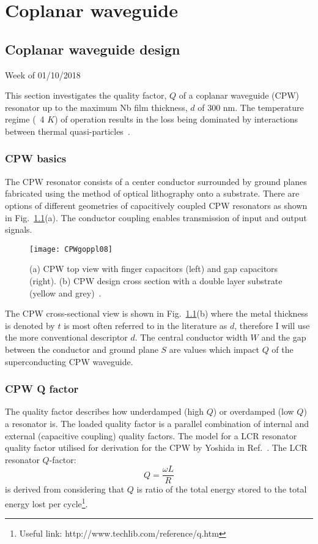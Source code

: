 \chapter{Coplanar waveguide}
\section{\label{sec:Coplanar Waveguide Design}Coplanar waveguide design}
Week of 01/10/2018

\noindent This section investigates the quality factor, $Q$ of a coplanar waveguide (CPW) resonator up to the maximum Nb film thickness, $d$ of 300 nm. The temperature regime (~4 $K$) of operation results in the loss being dominated by interactions between thermal quasi-particles~\citep{doi:10.1063/1.4962172}.      

\subsection{CPW basics}

\noindent The CPW resonator consists of a center conductor surrounded by ground planes fabricated using the method of optical lithography onto a substrate. There are options of different geometries of capacitively coupled CPW resonators as shown in Fig.~\ref{fig:CPWgoppl08}(a). The conductor coupling enables transmission of input and output signals.

\begin{figure}[h]
\centering
\texttt{[image: CPWgoppl08]}
\caption{\label{fig:CPWgoppl08} (a) CPW top view with finger capacitors (left) and gap capacitors (right). (b) CPW design cross section with a double layer substrate (yellow and grey)~\citep{doi:10.1063/1.3010859}.}
\end{figure}

The CPW cross-sectional view is shown in Fig.~\ref{fig:CPWgoppl08}(b) where the metal thickness is denoted by $t$ is most often referred to in the literature as $d$, therefore I will use the more conventional descriptor $d$. The central conductor width $W$ and the gap between the conductor and ground plane $S$ are values which impact $Q$ of the superconducting CPW waveguide. 
 
  

\subsection{CPW Q factor}
The quality factor describes how underdamped (high $Q$) or overdamped (low $Q$) a resonator is. The loaded quality factor is a parallel combination of internal and external (capacitive coupling) quality factors. The model for a LCR resonator quality factor utilised for derivation for the CPW by Yoshida in Ref.~\citep{402973}. The LCR resonator $Q$-factor:
\begin{equation}
\label{eq:LCRqfactor}
Q= \frac{\omega L}{R}
\end{equation}
is derived from considering that $Q$ is ratio of the total energy stored to the total energy lost per cycle\footnote{Useful link: http://www.techlib.com/reference/q.htm}. 

